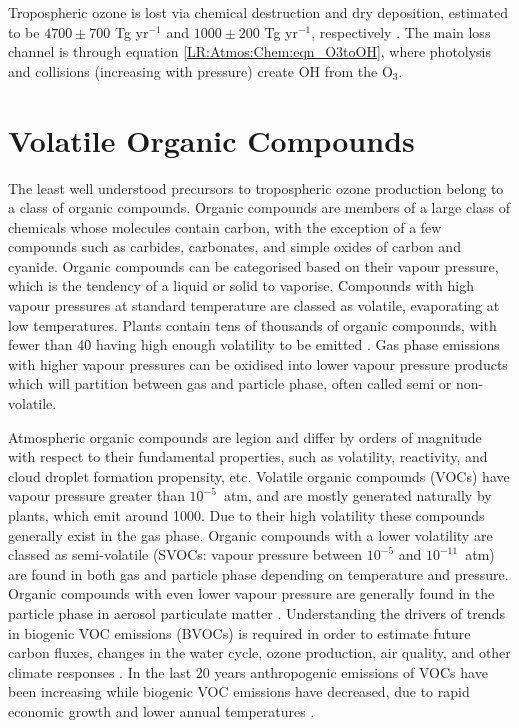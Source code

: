     Tropospheric ozone is lost via chemical destruction and dry deposition, estimated to be $4700\pm700$ Tg yr$^{-1}$ and $1000\pm200$ Tg yr$^{-1}$, respectively \parencite{Stevenson2006,Young2018}.
    The main loss channel is through equation \ref{LR:Atmos:Chem:eqn_O3toOH}, where photolysis and collisions (increasing with pressure) create OH from the O$_3$.
    

\section{Volatile Organic Compounds}
\label{LR:VOCs}

  The least well understood precursors to tropospheric ozone production belong to a class of organic compounds.
  Organic compounds are members of a large class of chemicals whose molecules contain carbon, with the exception of a few compounds such as carbides, carbonates, and simple oxides of carbon and cyanide.
  Organic compounds can be categorised based on their vapour pressure, which is the tendency of a liquid or solid to vaporise.
  Compounds with high vapour pressures at standard temperature are classed as volatile, evaporating at low temperatures.
  Plants contain tens of thousands of organic compounds, with fewer than 40 having high enough volatility to be emitted \parencite{Guenther2000}.
  Gas phase emissions with higher vapour pressures can be oxidised into lower vapour pressure products which will partition between gas and particle phase, often called semi or non-volatile. 
  
  Atmospheric organic compounds are legion and differ by orders of magnitude with respect to their fundamental properties, such as volatility, reactivity, and cloud droplet formation propensity, etc.
  Volatile organic compounds (VOCs) have vapour pressure greater than $10^{-5}$~atm, and are mostly generated naturally by plants, which emit around 1000\tgpyr \parencite{Guenther1995, Glasius2016}.
  Due to their high volatility these compounds generally exist in the gas phase.
  Organic compounds with a lower volatility are classed as semi-volatile (SVOCs: vapour pressure between $10^{-5}$ and $10^{-11}$~atm) are found in both gas and particle phase depending on temperature and pressure.
  Organic compounds with even lower vapour pressure are generally found in the particle phase in aerosol particulate matter \parencite{Glasius2016}.
  Understanding the drivers of trends in biogenic VOC emissions (BVOCs) is required in order to estimate future carbon fluxes, changes in the water cycle, ozone production, air quality, and other climate responses \parencite{Yue2015}.
  In the last 20 years anthropogenic emissions of VOCs have been increasing while biogenic VOC emissions have decreased, due to rapid economic growth and lower annual temperatures \parencite{Stavrakou2014, Kwon2017}.
  
